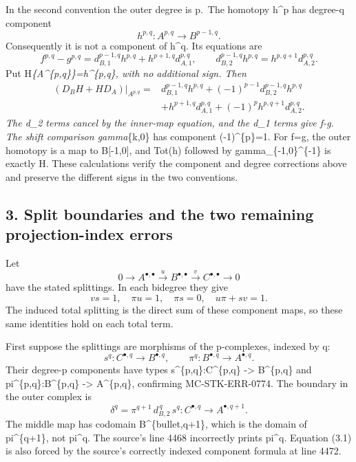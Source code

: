 \documentclass[11pt]{article}
\begin{document}
In the second convention the outer degree is p.~The homotopy h\^{}p has degree-q component \[
h^{p,q}:A^{p,q}\longrightarrow B^{p-1,q}.
\] Consequently it is not a component of h\^{}q. Its equations are \[
f^{p,q}-g^{p,q}
=d_{B,1}^{p-1,q}h^{p,q}+h^{p+1,q}d_{A,1}^{p,q},
\qquad
d_{B,2}^{p-1,q}h^{p,q}=h^{p,q+1}d_{A,2}^{p,q}.
\] Put H\textbar{}\emph{\{A\^{}\{p,q\}\}=h\^{}\{p,q\}, with no additional sign. Then \[
\begin{aligned}
(D_BH+HD_A)|_{A^{p,q}}
={}&d_{B,1}^{p-1,q}h^{p,q}
 +(-1)^{p-1}d_{B,2}^{p-1,q}h^{p,q}\\
 &+h^{p+1,q}d_{A,1}^{p,q}
 +(-1)^p h^{p,q+1}d_{A,2}^{p,q}.
\end{aligned}
\] The d\_2 terms cancel by the inner-map equation, and the d\_1 terms give f-g. The shift comparison gamma}\{k,0\} has component (-1)\^{}\{p\}=1. For f=g, the outer homotopy is a map to B{[}-1,0{]}, and Tot(h) followed by gamma\_\{-1,0\}\^{}\{-1\} is exactly H. These calculations verify the component and degree corrections above and preserve the different signs in the two conventions.

\subsection{3. Split boundaries and the two remaining projection-index errors}\label{note-04-split-boundaries-and-the-two-remaining-projection-index-errors}

Let \[
0\longrightarrow A^{\bullet,\bullet}
\xrightarrow{u}B^{\bullet,\bullet}
\xrightarrow{v}C^{\bullet,\bullet}\longrightarrow0
\] have the stated splittings. In each bidegree they give \[
v s=1,\quad \pi u=1,\quad \pi s=0,\quad u\pi+s v=1.
\] The induced total splitting is the direct sum of these component maps, so these same identities hold on each total term.

First suppose the splittings are morphisms of the p-complexes, indexed by q: \[
s^q:C^{\bullet,q}\longrightarrow B^{\bullet,q},\qquad
\pi^q:B^{\bullet,q}\longrightarrow A^{\bullet,q}.
\] Their degree-p components have types s\^{}\{p,q\}:C\^{}\{p,q\} -\textgreater{} B\^{}\{p,q\} and pi\^{}\{p,q\}:B\^{}\{p,q\} -\textgreater{} A\^{}\{p,q\}, confirming MC-STK-ERR-0774. The boundary in the outer complex is \[
\boxed{\quad
\delta^q=\pi^{q+1}\,d_{B,2}^{\,q}\,s^q:
C^{\bullet,q}\longrightarrow A^{\bullet,q+1}.
\quad}                                                     \tag{3.1}
\] The middle map has codomain B\^{}\{bullet,q+1\}, which is the domain of pi\^{}\{q+1\}, not pi\^{}q. The source's line 4468 incorrectly prints pi\^{}q. Equation (3.1) is also forced by the source's correctly indexed component formula at line 4472.
\end{document}
